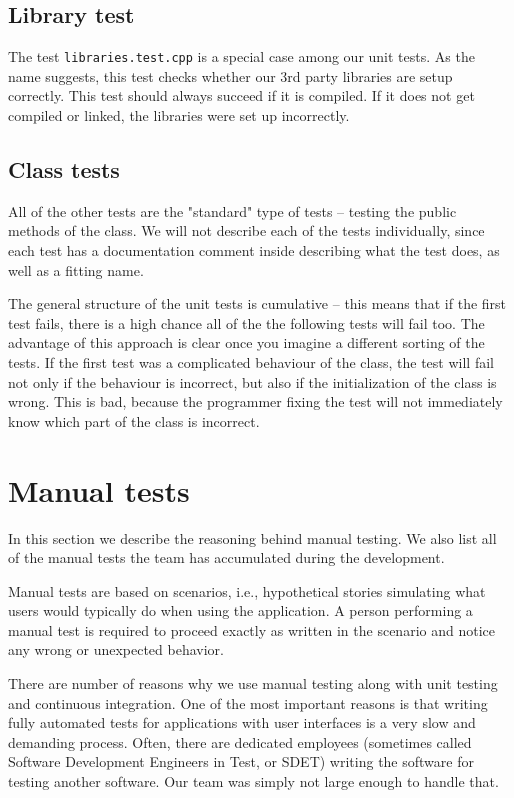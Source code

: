 \subsection{Library test}

The test \texttt{libraries.test.cpp} is a special case among our unit tests. As the name suggests, this test checks whether our 3rd party libraries are setup correctly. This test should always succeed if it is compiled. If it does not get compiled or linked, the libraries were set up incorrectly.

\subsection{Class tests}

All of the other tests are the "standard" type of tests -- testing the public methods of the class. We will not describe each of the tests individually, since each test has a documentation comment inside describing what the test does, as well as a fitting name. 

The general structure of the unit tests is cumulative -- this means that if the first test fails, there is a high chance all of the the following tests will fail too. The advantage of this approach is clear once you imagine a different sorting of the tests. If the first test was a complicated behaviour of the class, the test will fail not only if the behaviour is incorrect, but also if the initialization of the class is wrong. This is bad, because the programmer fixing the test will not immediately know which part of the class is incorrect.

\section{Manual tests}

In this section we describe the reasoning behind manual testing. We also list all of the manual tests the team has accumulated during the development.

Manual tests are based on scenarios, i.e., hypothetical stories simulating what users would typically do when using the application.
A person performing a manual test is required to proceed exactly as written in the scenario and notice any wrong or unexpected behavior.

There are number of reasons why we use manual testing along with unit testing and continuous integration.
One of the most important reasons is that writing fully automated tests for applications with user interfaces is a very slow and demanding process.
Often, there are dedicated employees (sometimes called Software Development Engineers in Test, or SDET) writing the software for testing another software.
Our team was simply not large enough to handle that.

